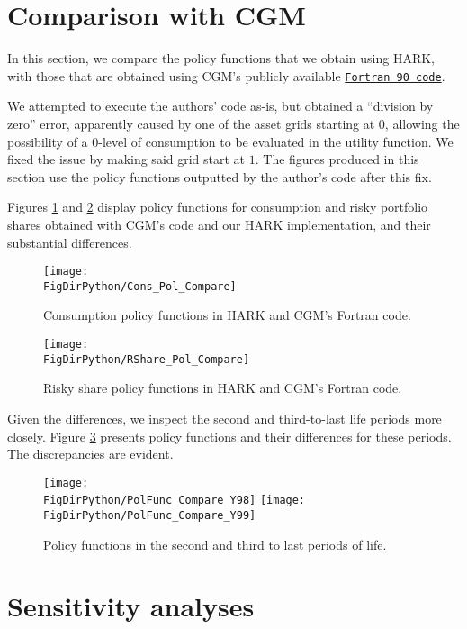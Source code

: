 \documentclass[../CGMPort.tex]{subfiles}
\begin{document}
\section{Comparison with CGM}\label{sec:Comparison}

In this section, we compare the policy functions that we obtain using HARK, with those that are obtained using CGM's publicly available 
\href{http://faculty.london.edu/fgomes/cgmcode.ZIP}{\texttt{Fortran 90 code}}.

We attempted to execute the authors' code as-is, but obtained a ``division by zero'' error, apparently caused by one of the asset grids starting at $0$,
allowing the possibility of a $0$-level of consumption to be evaluated in the
utility function. We fixed the issue by making said grid start at $1$. The
figures produced in this section use the policy functions outputted by the
author's code after this fix. 

Figures \ref{fig:heatmapCons} and \ref{fig:heatmapRshare} display policy 
functions for consumption and risky portfolio shares obtained with CGM's code and our HARK implementation, and their substantial differences.

\begin{figure}[h]
	\texttt{[image: \\FigDirPython/Cons\_Pol\_Compare]}
	\caption{Consumption policy functions in HARK and CGM's Fortran 
	code.}\label{fig:heatmapCons}
\end{figure}

\begin{figure}[h]
	\texttt{[image: \\FigDirPython/RShare\_Pol\_Compare]}
	\caption{Risky share policy functions in HARK and CGM's Fortran code.}
	\label{fig:heatmapRshare}
\end{figure}

Given the differences, we inspect the second and third-to-last life periods more closely. Figure \ref{fig:pol_funcs_last} presents policy functions and their differences for these periods. The discrepancies are evident.

\begin{figure}[h]
	\texttt{[image: \\FigDirPython/PolFunc\_Compare\_Y98]}
	\texttt{[image: \\FigDirPython/PolFunc\_Compare\_Y99]}
	\caption{Policy functions in the second and third to last periods of life.}
	\label{fig:pol_funcs_last}
\end{figure}


\section{Sensitivity analyses}\label{sec:Sensitivity}
\end{document}
